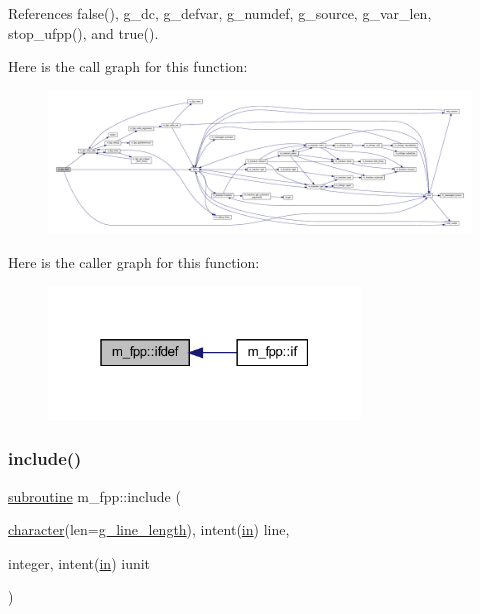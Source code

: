 References false(), g\+\_\+dc, g\+\_\+defvar, g\+\_\+numdef, g\+\_\+source, g\+\_\+var\+\_\+len, stop\+\_\+ufpp(), and true().

Here is the call graph for this function\+:
\nopagebreak
\begin{figure}[H]
\begin{center}
\leavevmode
\includegraphics[width=350pt]{namespacem__fpp_acc125ade915dbf457a06801f2e241306_cgraph}
\end{center}
\end{figure}
Here is the caller graph for this function\+:
\nopagebreak
\begin{figure}[H]
\begin{center}
\leavevmode
\includegraphics[width=235pt]{namespacem__fpp_acc125ade915dbf457a06801f2e241306_icgraph}
\end{center}
\end{figure}
\mbox{\label{namespacem__fpp_ae2b0d4bedb5c55788d054fefdef54fcc}} 
\subsubsection{\texorpdfstring{include()}{include()}}
{\footnotesize\ttfamily \hyperlink{M__stopwatch_83_8txt_acfbcff50169d691ff02d4a123ed70482}{subroutine} m\+\_\+fpp\+::include (\begin{DoxyParamCaption}\item[{\hyperlink{option__stopwatch_83_8txt_abd4b21fbbd175834027b5224bfe97e66}{character}(len=\hyperlink{namespacem__fpp_ab93f8756cf248cf8db932573009d4664}{g\+\_\+line\+\_\+length}), intent(\hyperlink{M__journal_83_8txt_afce72651d1eed785a2132bee863b2f38}{in})}]{line,  }\item[{integer, intent(\hyperlink{M__journal_83_8txt_afce72651d1eed785a2132bee863b2f38}{in})}]{iunit }\end{DoxyParamCaption})}



